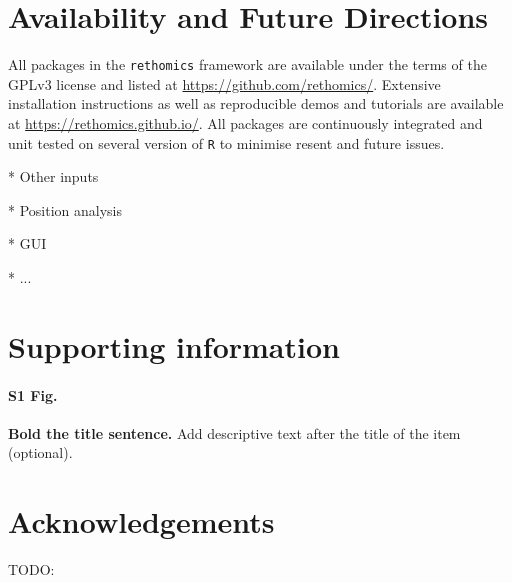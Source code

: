 \documentclass[10pt,letterpaper]{article}\usepackage[]{graphicx}\usepackage[]{color}
\begin{document}
% 

\section*{Availability and Future Directions}
All packages in the \texttt{rethomics} framework are available under the terms of the GPLv3 license and listed at
\href{https://github.com/rethomics}{https://github.com/rethomics/}.
Extensive installation instructions as well as reproducible demos and tutorials are available at
\href{https://rethomics.github.io/}{https://rethomics.github.io/}.
All packages are continuously integrated and unit tested on several version of \texttt{R} to minimise resent and future issues.

* Other inputs 

* Position analysis

* GUI

* ... 


\section*{Supporting information}

\paragraph*{S1 Fig.}
\label{S1-Fig}
{\bf Bold the title sentence.} Add descriptive text after the title of the item (optional).


\section*{Acknowledgements}
TODO:
\end{document}
